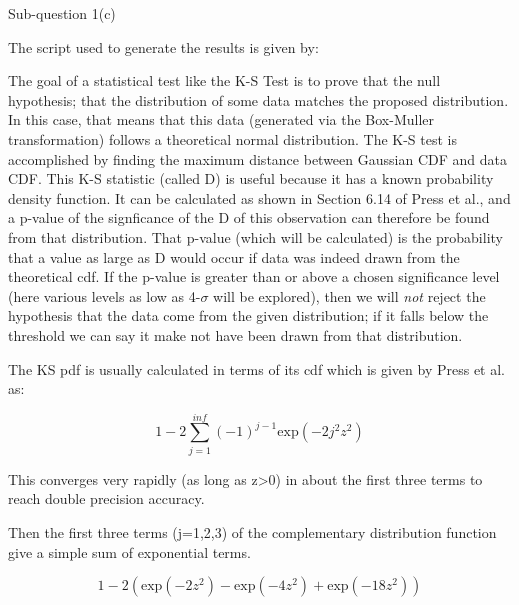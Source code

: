 \FloatBarrier

\begin{subsection}{Sub-question 1(c)}

The script used to generate the results is given by:
  


The goal of a statistical test like the K-S Test is to prove that the null hypothesis; that the distribution of some data matches the proposed distribution. In this case, that means that this data (generated via the Box-Muller transformation) follows a theoretical normal distribution. The K-S test is accomplished by finding the maximum distance between Gaussian CDF and data CDF. This K-S statistic (called D) is useful because it has a known probability density function. It can be calculated as shown in Section 6.14 of Press et al., and a p-value of the signficance of the D of this observation can therefore be found from that distribution. That p-value (which will be calculated) is the probability that a value as large as D would occur if data was indeed drawn from the theoretical cdf. If the p-value is greater than or above a chosen significance level (here various levels as low as 4-$\sigma$ will be explored), then we will \textit{not} reject the hypothesis that the data come from the given distribution; if it falls below the threshold we can say it make not have been drawn from that distribution.

The KS pdf is usually calculated in terms of its cdf which is given by Press et al. as:

\begin{equation}
  1-2\sum_{j=1}^{inf}(-1)^{j-1}\text{exp}(-2j^2z^2)
\end{equation}

This converges very rapidly (as long as z>0) in about the first three terms to reach double precision accuracy.

Then the first three terms (j=1,2,3) of the complementary distribution function give a simple sum of exponential terms.

\begin{equation}
  1-2\left( \text{exp}(-2z^2) - \text{exp}(-4z^2) + \text{exp}(-18z^2)\right)
\end{equation}


\end{subsection}
